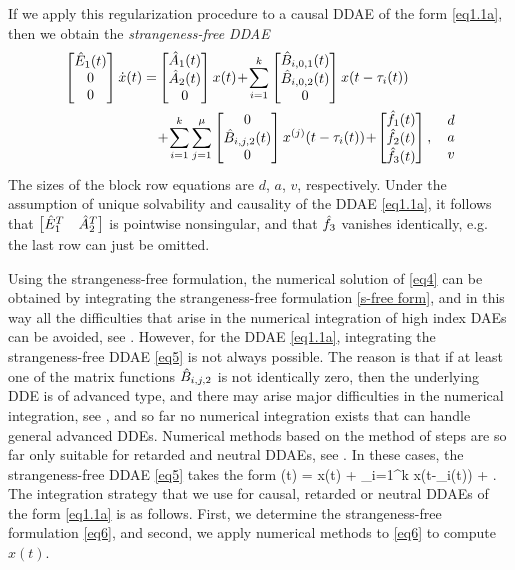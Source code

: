 \documentclass[final,reqno]{siamltex}
\begin{document}
If we apply this regularization procedure to a causal DDAE of the form \eqref{eq1.1a}, then we obtain the \emph{strangeness-free DDAE}
%
\begin{equation}\label{eq5}
\begin{aligned}
 \m{\hE_{1}(t) \\ 0 \\ 0} \dot{x}(t) =&
\m{\hA_{1}(t) \\ \hA_{2}(t) \\ 0} x(t) \!+\!
\sum_{i=1}^k \m{\hB_{i,0,1}(t) \\ \hB_{i,0,2}(t) \\ 0} x(t-\tau_i(t))\\&
 \!+\!  \sum_{i=1}^k\sum_{j=1}^{\mu} \m{0 \\ \hB_{i,j,2}(t) \\ 0} x^{(j)}(t-\tau_i(t))
 \!+\! \m{\hf_{1}(t) \\ \hf_{2}(t) \\ \hf_{3}(t)}, \quad \pm{d \\ a \\ v}
\end{aligned}
\end{equation}
%
The sizes of the block row equations are $d$, $a$, $v$, respectively. Under the assumption of unique solvability and causality of the DDAE \eqref{eq1.1a}, it follows that $\begin{bmatrix} \hat{E}^T_1 & \hat{A}^T_2 \end{bmatrix}$ is pointwise nonsingular, and that $\hat{f}_3$ vanishes identically, e.g. the last row can just be omitted.

Using the strangeness-free formulation, the numerical solution of \eqref{eq4} can be obtained by integrating the strangeness-free formulation \eqref{s-free form}, and in this way all the difficulties that arise in the numerical integration of high index DAEs can be avoided, see \cite{KunM96a,KunM96c,KunM06}. However, for the DDAE \eqref{eq1.1a}, integrating the strangeness-free DDAE \eqref{eq5} is not always possible. The reason is that if at least one of the matrix functions $\hat{B}_{i,j,2}$ is not identically zero, then the underlying DDE
is of advanced type, and there may arise major difficulties in the numerical integration, see \cite{BelZ03}, and so far no numerical integration exists that can handle general advanced DDEs. Numerical methods based on the method of steps are so far only suitable for retarded and neutral DDAEs, see \cite{AscP95,GugH07,Hau97,HaM14}. In these cases, the strangeness-free DDAE \eqref{eq5} takes the form
%
\be\label{eq6}
  (t) \!=\!  x(t) \!+\!
 \sum_{i=1}^k x(t-\tau_i(t)) \!+\! .
\ee
%
The integration strategy that we use for causal, retarded or neutral DDAEs of the form \eqref{eq1.1a} is as follows. First, we determine the strangeness-free formulation \eqref{eq6}, and second, we apply numerical methods to \eqref{eq6} to compute $x(t)$.\\
\end{document}
